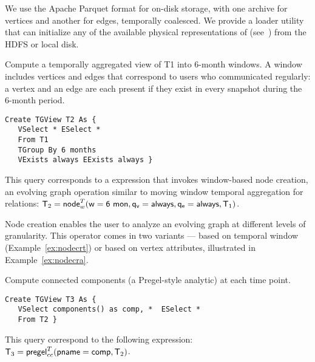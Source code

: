 We use the Apache Parquet format for on-disk storage, with one archive
for vertices and another for edges, temporally coalesced.  We provide
a loader utility that can initialize any of the available physical
representations of \tgs (see~\cite{PortalarXiv2016}) from the HDFS or
local disk.

\begin{example}
\label{ex:nodecrt}
\vspace{-0.1cm}

Compute a temporally aggregated view of T1 into 6-month windows.  A
window includes vertices and edges that correspond to users who
communicated regularly: a vertex and an edge are each present if they
exist in every snapshot during the 6-month period.

\begin{small} 
\begin{verbatim}
Create TGView T2 As { 
   VSelect * ESelect *
   From T1
   TGroup By 6 months
   VExists always EExists always }
\end{verbatim}
\vspace{-0.1cm}
\end{small}

This query corresponds to a \tga expression that invokes window-based
node creation, an evolving graph operation similar to moving window
temporal aggregation for relations:
$\mathsf{T}_2 = \textsf{node}^T_w(\mathsf{w=6~mon},\mathsf{q_v=always},\mathsf{q_e=always},\mathsf{T}_1)$.

\vspace{-0.1cm}
\end{example}

Node creation enables the user to analyze an evolving graph at
different levels of granularity.  This operator comes in two variants
--- based on temporal window (Example~\ref{ex:nodecrt}) or based
on vertex attributes, illustrated in Example~\ref{ex:nodecra}.

\begin{example}
\label{ex:cc}
\vspace{-0.1cm}

Compute connected components (a Pregel-style analytic) at each time
point. 

\begin{small} 
\begin{verbatim}
Create TGView T3 As { 
   VSelect components() as comp, *  ESelect *
   From T2 }
\end{verbatim}
\vspace{-0.1cm}
\end{small}

This query correspond to the following \tga expression:
$\mathsf{T}_3 = \textsf{pregel}^T_{cc} (\mathsf{pname=comp}, \mathsf{T}_2)$.

\vspace{-0.1cm}
\end{example}


